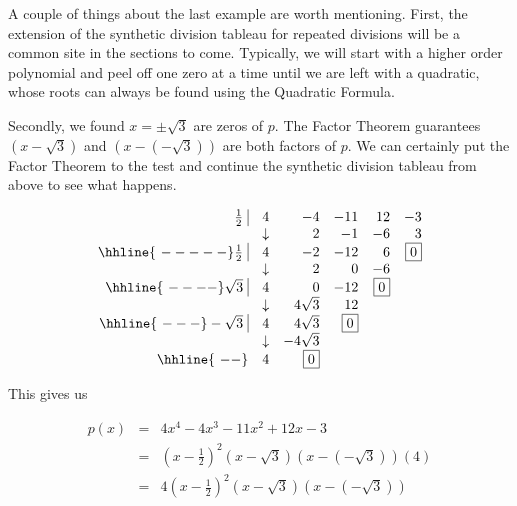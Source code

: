 A couple of things about the last example are worth mentioning. First, the extension of the synthetic division tableau for repeated divisions will be a common site in the sections to come. Typically, we will start with a higher order polynomial and peel off one zero at a time until we are left with a quadratic, whose roots can always be found using the Quadratic Formula.  

\medskip

Secondly, we found $x = \pm \sqrt{3}$ are zeros of $p$.  The Factor Theorem guarantees $\left(x-\sqrt{3}\right)$ and $\left(x - \left(-\sqrt{3}\right)\right)$ are both factors of $p$.  We can certainly put the Factor Theorem to the test and continue the synthetic division tableau from above to see what happens.

\[\begin{array}{rrrrrr}
 \frac{1}{2} \, \, \vline& 4 & -4 & -11  & 12 & -3 \\

  & \downarrow &  2  &  -1  & -6 & 3\\ \hhline{~-----} 
  
  \frac{1}{2} \, \, \vline&  4  &   -2  & -12 & 6 &  \fbox{$0$}  \\
    
  & \downarrow &  2  &  0  & -6 &\\ \hhline{~----} 
 
  
 \sqrt{3} \, \, \vline  & 4  &   0  & -12 & \fbox{0} &   \\
  
                        & \downarrow &  4\sqrt{3}  & 12  & &\\ \hhline{~---} 
 
   -\sqrt{3} \, \, \vline  & 4  &  4\sqrt{3}  & \fbox{0} &  &   \\  
       
                          & \downarrow &  -4\sqrt{3}  &   & &\\ \hhline{~--} 
       
													& 4  &  \fbox{0}  &  &  &   \\

\end{array}\]

This gives us

 \[\begin{array}{rcl} 
 
 p(x) & = &  4x^4-4x^3-11x^2+12x-3 \\
        & = & \left(x-\frac{1}{2}\right)^2 \left(x-\sqrt{3}\right)\left(x - \left(-\sqrt{3}\right)\right) (4) \\
        & = &  4\left(x-\frac{1}{2}\right)^2 \left(x-\sqrt{3}\right)\left(x - \left(-\sqrt{3}\right)\right) \\ \end{array} \]

